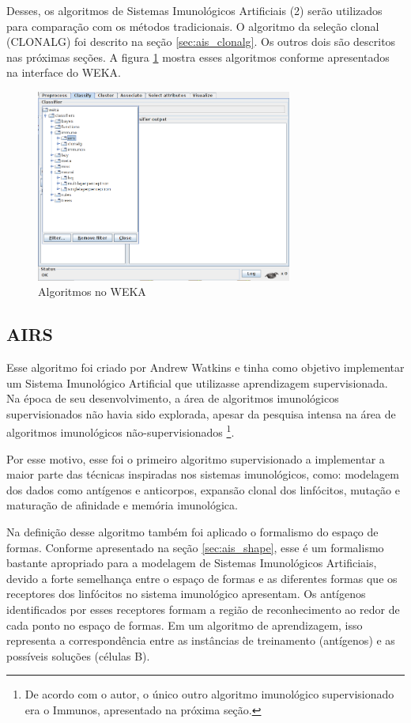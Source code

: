 Desses, os algoritmos de Sistemas Imunológicos Artificiais (2) serão utilizados para comparação com os métodos tradicionais. O algoritmo da seleção clonal (CLONALG) foi descrito na seção \ref{sec:ais_clonalg}. Os outros dois são descritos nas próximas seções. A figura \ref{fig:prop_wekaais} mostra esses algoritmos conforme apresentados na interface do WEKA.

\begin{figure}[h!]
    \centering
    \caption{Algoritmos no WEKA}
    \label{fig:prop_wekaais}
    \includegraphics[width=0.75\textwidth]{img/weka_ais.png}
\end{figure}

\subsection{AIRS}
\label{sec:prop_airs}

Esse algoritmo foi criado por Andrew Watkins \cite{Andrew2003} e tinha como objetivo implementar um Sistema Imunológico Artificial que utilizasse aprendizagem supervisionada. Na época de seu desenvolvimento, a área de algoritmos imunológicos supervisionados não havia sido explorada, apesar da pesquisa intensa na área de algoritmos imunológicos não-supervisionados \footnote{De acordo com o autor, o único outro algoritmo imunológico supervisionado era o Immunos, apresentado na próxima seção.}.

Por esse motivo, esse foi o primeiro algoritmo supervisionado a implementar a maior parte das técnicas inspiradas nos sistemas imunológicos, como: modelagem dos dados como antígenos e anticorpos, expansão clonal dos linfócitos, mutação e maturação de afinidade e memória imunológica.

Na definição desse algoritmo também foi aplicado o formalismo do espaço de formas. Conforme apresentado na seção \ref{sec:ais_shape}, esse é um formalismo bastante apropriado para a modelagem de Sistemas Imunológicos Artificiais, devido a forte semelhança entre o espaço de formas e as diferentes formas que os receptores dos linfócitos no sistema imunológico apresentam. Os antígenos identificados por esses receptores formam a região de reconhecimento ao redor de cada ponto no espaço de formas. Em um algoritmo de aprendizagem, isso representa a correspondência entre as instâncias de treinamento (antígenos) e as possíveis soluções (células B).


